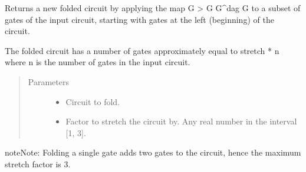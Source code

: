 \documentclass[letterpaper,10pt,english]{sphinxmanual}
\begin{document}
\begin{fulllineitems}
\label{\detokenize{index:mitiq.folding_cirq.fold_gates_from_left}}
Returns a new folded circuit by applying the map G \sphinxhyphen{}\textgreater{} G G\textasciicircum{}dag G to a subset of gates of the input circuit,
starting with gates at the left (beginning) of the circuit.

The folded circuit has a number of gates approximately equal to stretch * n where n is the number of gates in
the input circuit.
\begin{quote}\begin{description}
\item[{Parameters}] \leavevmode\begin{itemize}
\item {} 
 \sphinxhyphen{}\sphinxhyphen{} Circuit to fold.

\item {} 
 \sphinxhyphen{}\sphinxhyphen{} Factor to stretch the circuit by. Any real number in the interval {[}1, 3{]}.

\end{itemize}

\end{description}\end{quote}

\begin{sphinxadmonition}{note}{Note:}
Folding a single gate adds two gates to the circuit, hence the maximum stretch factor is 3.
\end{sphinxadmonition}

\end{fulllineitems}

\end{document}
